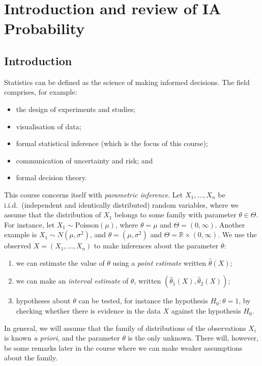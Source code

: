 \section{Introduction and review of IA Probability}

\subsection{Introduction}
Statistics can be defined as the science of making informed decisions.
The field comprises, for example:
\begin{itemize}
	\item the design of experiments and studies;
	\item visualisation of data;
	\item formal statistical inference (which is the focus of this course);
	\item communication of uncertainty and risk; and
	\item formal decision theory.
\end{itemize}
This course concerns itself with \textit{parametric inference}.
Let $X_1, \dots, X_n$ be i.i.d.\ (independent and identically distributed) random variables, where we assume that the distribution of $X_1$ belongs to some family with parameter $\theta \in \Theta$.
For instance, let $X_1 \sim \mathrm{Poisson}(\mu)$, where $\theta = \mu$ and $\Theta = (0, \infty)$.
Another example is $X_1 \sim N(\mu, \sigma^2)$, and $\theta = (\mu, \sigma^2)$ and $\Theta = \mathbb R \times (0, \infty)$.
We use the observed $X = (X_1, \dots, X_n)$ to make inferences about the parameter $\theta$:
\begin{enumerate}
	\item we can estimate the value of $\theta$ using a \textit{point estimate} written $\hat \theta(X)$;
	\item we can make an \textit{interval estimate} of $\theta$, written $(\hat \theta_1(X), \hat \theta_2(X))$;
	\item hypotheses about $\theta$ can be tested, for instance the hypothesis $H_0 \colon \theta = 1$, by checking whether there is evidence in the data $X$ against the hypothesis $H_0$.
\end{enumerate}
\begin{remark}
	In general, we will assume that the family of distributions of the observations $X_i$ is known \textit{a priori}, and the parameter $\theta$ is the only unknown.
	There will, however, be some remarks later in the course where we can make weaker assumptions about the family.
\end{remark}


